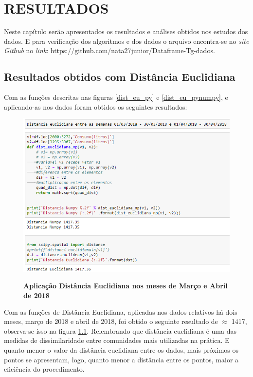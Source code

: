 \newpage
\chapter{RESULTADOS}

\par Neste capítulo serão apresentados os resultados e análises obtidos nos estudos dos dados. E para verificação dos algoritmos e dos dados o arquivo encontra-se no \emph{site} \emph{Github} no \emph{link}: https://github.com/nata27junior/Dataframe-Tg-dados.



\section{Resultados obtidos com Distância Euclidiana}
\par Com as funções descritas nas figuras \ref{dist_eu_py} e \ref{dist_eu_pynumpy}, e aplicando-as  nos dados  foram obtidos os seguintes resultados:

\begin{figure}[ht]
	\caption{\textbf{Aplicação Distância Euclidiana nos meses de Março e Abril de 2018}}
	\centering
		\includegraphics[width=\textwidth,height=\textheight , keepaspectratio]{figuras/distanciaeuclidiana01-03-2018-30-03-2018-01-04-18-30-04-18}
		\label{dist_Marco_Abril}
\end{figure}
\par Com as funções de Distância Euclidiana, aplicadas nos dados relativos há dois meses, março de 2018 e abril de 2018, foi obtido o seguinte resultado de  $\approx$ 1417, observa-se isso na figura \ref{dist_Marco_Abril}.  Relembrando que distância euclidiana é uma das medidas de dissimilaridade entre comunidades mais utilizadas na prática. E quanto menor o valor da distância euclidiana entre os dados, mais próximos os pontos se apresentam, logo, quanto menor a distância entre os pontos, maior a eficiência do procedimento.

